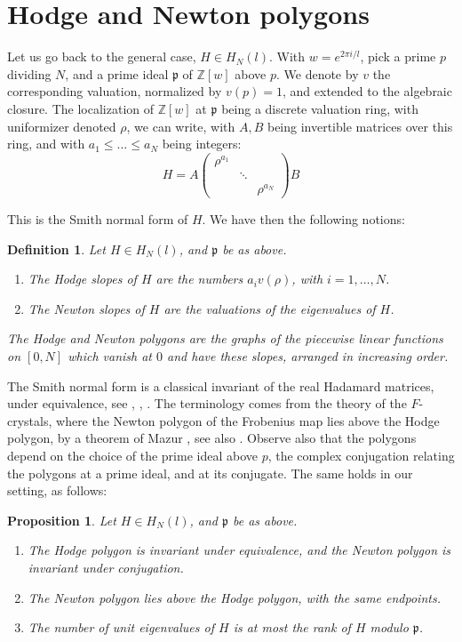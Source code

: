 \documentclass[11pt]{amsart}
\newtheorem{proposition}[theorem]{Proposition}
\newtheorem{definition}[theorem]{Definition}
\theoremstyle{definition}
\begin{document}
\section{Hodge and Newton polygons}

Let us go back to the general case, $H\in H_N(l)$. With $w=e^{2\pi i/l}$, pick a prime $p$ dividing $N$, and a prime ideal $\mathfrak p$ of $\mathbb Z[w]$ above $p$. We denote by $v$ the corresponding valuation, normalized by $v(p)=1$, and extended to the algebraic closure. The localization of $\mathbb Z[w]$ at $\mathfrak p$ being a discrete valuation ring, with uniformizer denoted $\rho$, we can write, with $A,B$ being invertible matrices over this ring, and with $a_1\leq\ldots\leq a_N$ being integers:
$$H=A\begin{pmatrix}\rho^{a_1}\\&\ddots\\&&\rho^{a_N}\end{pmatrix}B$$

This is the Smith normal form of $H$. We have then the following notions:

\begin{definition}
Let $H\in H_N(l)$, and $\mathfrak p$ be as above.
\begin{enumerate}
\item The Hodge slopes of $H$ are the numbers $a_iv(\rho)$, with $i=1,\ldots,N$.

\item The Newton slopes of $H$ are the valuations of the eigenvalues of $H$.
\end{enumerate}
The Hodge and Newton polygons are the graphs of the piecewise linear functions on $[0,N]$ which vanish at $0$ and have these slopes, arranged in increasing order.
\end{definition}

The Smith normal form is a classical invariant of the real Hadamard matrices, under equivalence, see \cite{mwa}, \cite{new}, \cite{wwa}. The terminology comes from the theory of the $F$-crystals, where the Newton polygon of the Frobenius map lies above the Hodge polygon, by a theorem of Mazur \cite{maz}, see also \cite{kat}. Observe also that the polygons depend on the choice of the prime ideal above $p$, the complex conjugation relating the polygons at a prime ideal, and at its conjugate. The same holds in our setting, as follows:

\begin{proposition}\label{phn}
Let $H\in H_N(l)$, and $\mathfrak p$ be as above.
\begin{enumerate}
\item The Hodge polygon is invariant under equivalence, and the Newton polygon is invariant under conjugation.

\item The Newton polygon lies above the Hodge polygon, with the same endpoints.

\item The number of unit eigenvalues of $H$ is at most the rank of $H$ modulo $\mathfrak p$.
\end{enumerate}
\end{proposition}
\end{document}
